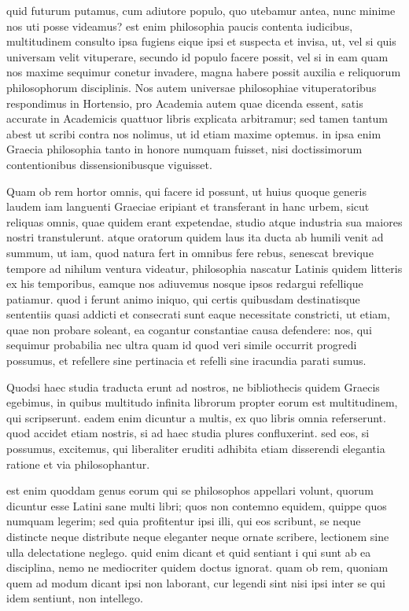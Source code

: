  quid futurum putamus, cum adiutore populo, quo utebamur antea, nunc minime nos uti posse videamus? est enim philosophia paucis contenta iudicibus, multitudinem consulto ipsa fugiens eique ipsi et suspecta et invisa, ut, vel si quis universam velit vituperare, secundo id populo facere possit, vel si in eam quam nos maxime sequimur conetur invadere, magna habere possit auxilia e reliquorum philosophorum disciplinis. Nos autem universae philosophiae vituperatoribus respondimus in Hortensio, pro Academia autem quae dicenda essent, satis accurate in Academicis quattuor libris explicata arbitramur; sed tamen tantum abest ut scribi contra nos nolimus, ut id etiam maxime optemus. in ipsa enim Graecia philosophia tanto in honore numquam fuisset, nisi doctissimorum contentionibus dissensionibusque viguisset.

 Quam ob rem hortor omnis, qui facere id possunt, ut huius quoque generis laudem iam languenti Graeciae eripiant et transferant in hanc urbem, sicut reliquas omnis, quae quidem erant expetendae, studio atque industria sua maiores nostri transtulerunt. atque oratorum quidem laus ita ducta ab humili venit ad summum, ut iam, quod natura fert in omnibus fere rebus, senescat brevique tempore ad nihilum ventura videatur, philosophia nascatur Latinis quidem litteris ex his temporibus, eamque nos adiuvemus nosque ipsos redargui refellique patiamur. quod i ferunt animo iniquo, qui certis quibusdam destinatisque sententiis quasi addicti et consecrati sunt eaque necessitate constricti, ut etiam, quae non probare soleant, ea cogantur constantiae causa defendere: nos, qui sequimur probabilia nec ultra quam id quod veri simile occurrit progredi possumus, et refellere sine pertinacia et refelli sine iracundia parati sumus.

 Quodsi haec studia traducta erunt ad nostros, ne bibliothecis quidem Graecis egebimus, in quibus multitudo infinita librorum propter eorum est multitudinem, qui scripserunt. eadem enim dicuntur a multis, ex quo libris omnia referserunt. quod accidet etiam nostris, si ad haec studia plures confluxerint. sed eos, si possumus, excitemus, qui liberaliter eruditi adhibita etiam disserendi elegantia ratione et via philosophantur.

 est enim quoddam genus eorum qui se philosophos appellari volunt, quorum dicuntur esse Latini sane multi libri; quos non contemno equidem, quippe quos numquam legerim; sed quia profitentur ipsi illi, qui eos scribunt, se neque distincte neque distribute neque eleganter neque ornate scribere, lectionem sine ulla delectatione neglego. quid enim dicant et quid sentiant i qui sunt ab ea disciplina, nemo ne mediocriter quidem doctus ignorat. quam ob rem, quoniam quem ad modum dicant ipsi non laborant, cur legendi sint nisi ipsi inter se qui idem sentiunt, non intellego.

